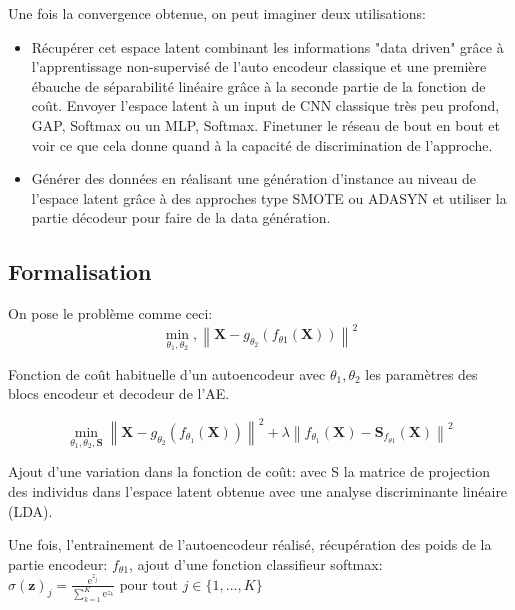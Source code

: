 Une fois la convergence obtenue, on peut imaginer deux utilisations:
\begin{itemize}
    \item Récupérer cet espace latent combinant les informations "data driven" grâce à l'apprentissage non-supervisé de l'auto encodeur classique et une première ébauche de séparabilité linéaire grâce à la seconde partie de la fonction de coût. Envoyer l'espace latent à un input de CNN classique très peu profond, GAP, Softmax ou un MLP, Softmax. Finetuner le réseau de bout en bout et voir ce que cela donne quand à la capacité de discrimination de l'approche. 
    \item Générer des données en réalisant une génération d'instance au niveau de l'espace latent grâce à des approches type SMOTE \cite{chawla2002smote} ou ADASYN \cite{he2008adasyn}  et utiliser la partie décodeur pour  faire de la data génération.
\end{itemize}

\subsection{Formalisation}
On pose le problème comme ceci: \newline
$$\min _{\theta_{1}, \theta_{2}},\left\|\mathbf{X}-g_{\theta_{2}}\left(f_{\theta 1}(\mathbf{X})\right)\right\|^{2}$$

Fonction de coût habituelle d'un autoencodeur avec $\theta_{1}, \theta_{2}$ les paramètres des blocs encodeur et decodeur de l’AE. 

$$\min _{\theta_{1}, \theta_{2}, \mathbf{S}}\left\|\mathbf{X}-g_{\theta_{2}}\left(f_{\theta_{1}}(\mathbf{X})\right)\right\|^{2}+\lambda\left\|f_{\theta_{1}}(\mathbf{X})-\mathbf{S}_{f_{\theta 1}}(\mathbf{X})\right\|^{2}$$

Ajout d'une variation dans la fonction de coût: avec S la matrice de projection des individus dans l'espace latent obtenue avec une analyse discriminante linéaire (LDA).

Une fois, l'entrainement de l'autoencodeur réalisé, récupération des poids de la partie encodeur: $f_{\theta 1}$, ajout d'une fonction classifieur softmax:\\ 

$\sigma(\mathbf{z})_{j}=\frac{\mathrm{e}^{z_{j}}}{\sum_{k=1}^{K} \mathrm{e}^{z_{k}}} \text { pour  tout } j \in\{1, \ldots, K\}$


